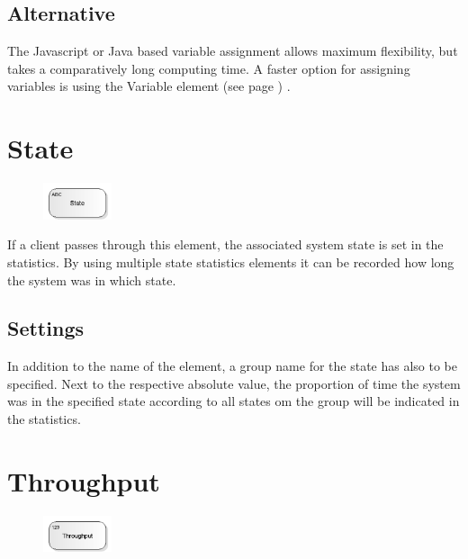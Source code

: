 \subsection*{Alternative}

The Javascript or Java based variable assignment allows maximum flexibility, but takes a comparatively long
computing time. A faster option for assigning variables is using the
Variable element (see page \pageref{ref:ModelElementSet}) .


\section{State}
\label{ref:ModelElementStateStatistics}

\begin{figure}
\vspace{-22pt}
\includegraphics[width=2cm]{imageModelElementStateStatistics.png}
\vspace{-22pt}
\end{figure}

If a client passes through this element, the associated system state is set in the statistics.
By using multiple state statistics elements it can be recorded how long the system
was in which state.

\subsection*{Settings}

In addition to the name of the element, a group name for the state has also to be specified.
Next to the respective absolute value, the proportion of time the system was in the specified
state according to all states om the group will be indicated in the statistics.


\section{Throughput}
\label{ref:ModelElementThroughput}

\begin{figure}
\vspace{-22pt}
\includegraphics[width=2cm]{imageModelElementThroughput.png}
\vspace{-22pt}
\end{figure}

